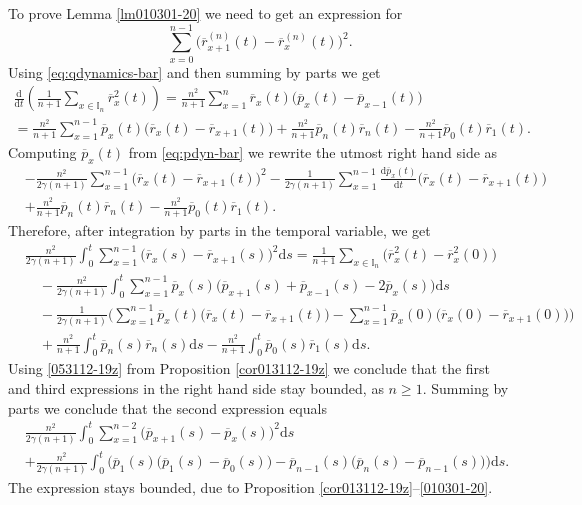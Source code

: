 \documentclass[EJP]{ejpecp} %
\newcommand\T{{\mathbb I}}
\newcommand \ga{\gamma}
\renewcommand{\ge}{\geqslant}
\newcommand{\dd  }{\mathrm{d}}
\renewcommand{\bar}{\overline}
\numberwithin{equation}{section}
\begin{document}
\label{sec6.5}

To prove Lemma \ref{lm010301-20} we need to get an expression for 
\[\sum_{x=0}^{n-1}\big(\bar r_{x+1}^{(n)}(t)-\bar
r_x^{(n)}(t)\big)^2. \]
Using \eqref{eq:qdynamics-bar} and then summing by parts we get
\begin{multline*}
\frac{\dd}{\dd t}\left(\frac{1}{n+1}\sum_{x\in\T_n}\bar
  r_x^2(t)\right)=\frac{n^2}{n+1}\sum_{x=1}^{n}\bar r_x(t)\big(\bar p_x(t)-\bar
  p_{x-1}(t)\big)\\
=\frac{n^2}{n+1}\sum_{x=1}^{n-1}\bar p_x(t)\big(\bar r_x(t)-\bar
  r_{x+1}(t)\big)+\frac{n^2}{n+1}\bar p_n(t) \bar
  r_n(t)-\frac{n^2}{n+1}\bar p_0(t) \bar r_1(t).
\end{multline*}
Computing  $\bar p_x(t)$ from \eqref{eq:pdyn-bar} we rewrite the
utmost right hand side as
\begin{align*}
&
-\frac{n^2}{2\ga(n+1)}\sum_{x=1}^{n-1}\big(\bar r_x(t)-\bar
  r_{x+1}(t)\big)^2
  -\frac{1}{2\ga(n+1)}\sum_{x=1}^{n-1}\frac{\dd\bar p_x(t)}{\dd t}\big(\bar r_x(t)-\bar
  r_{x+1}(t)\big)\\
&
+\frac{n^2}{n+1}\bar p_n(t) \bar
  r_n(t)-\frac{n^2}{n+1}\bar p_0(t) \bar r_1(t).
\end{align*}
Therefore, after integration by parts in the temporal variable, we get
\begin{align*}
&
\frac{n^2}{2\ga(n+1)}\int_0^t\sum_{x=1}^{n-1}\big(\bar r_x(s)-\bar
  r_{x+1}(s)\big)^2\dd s
=\frac{1}{n+1}\sum_{x\in\T_n}
  \big(\bar r_x^2(t)-\bar r_x^2(0)\big)
 \\
& \quad
 -\frac{n^2}{2\ga(n+1)}\int_0^t\sum_{x=1}^{n-1}\bar p_x(s)\big(\bar  p_{x+1}(s)+\bar p_{x-1}(s) - 2 \bar p_x(s)\big)\dd s\\
&\quad
 -\frac{1}{2\ga(n+1)}\bigg(\sum_{x=1}^{n-1}\bar p_x(t)\big(\bar r_x(t)-\bar
  r_{x+1}(t)\big)-\sum_{x=1}^{n-1}\bar p_x(0)\big(\bar r_x(0)-\bar
  r_{x+1}(0)\big)\bigg)\\
&\quad
+\frac{n^2}{n+1}\int_0^t\bar p_n(s) \bar
  r_n(s)\dd s-\frac{n^2}{n+1}\int_0^t\bar p_0(s) \bar r_1(s)\dd s.
\end{align*}
Using \eqref{053112-19z} from Proposition \ref{cor013112-19z} we conclude that the first and third expressions in the right hand side stay
bounded, as $n\ge1$.
Summing by parts we conclude that 
the second expression equals
\begin{align*}
&
\frac{n^2}{2\ga(n+1)}\int_0^t\sum_{x=1}^{n-2}\big(\bar
  p_{x+1}(s)- \bar  p_{x}(s)\big)^2\dd s\\
&
+\frac{n^2}{2\ga(n+1)}\int_0^t\Big(\bar p_1(s)\big(\bar
  p_1(s)- \bar  p_0(s)\big)-\bar p_{n-1}(s)\big(\bar
  p_n(s)- \bar  p_{n-1}(s)\big)\Big)\dd s.
\end{align*}
The expression stays bounded, due to  Proposition \ref{cor013112-19z}--\eqref{010301-20}.
\end{document}
